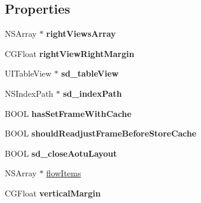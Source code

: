 \subsection*{Properties}
\begin{DoxyCompactItemize}
\item 
\mbox{\label{interface_s_d_u_i_view_category_manager_ae354640ae7cc9607e98d23fac2a69b25}} 
N\+S\+Array $\ast$ {\bfseries right\+Views\+Array}
\item 
\mbox{\label{interface_s_d_u_i_view_category_manager_afdbb633c6c8175f329a9cf359a4ccf23}} 
C\+G\+Float {\bfseries right\+View\+Right\+Margin}
\item 
\mbox{\label{interface_s_d_u_i_view_category_manager_a291791275c352d4af53d2c0990a12442}} 
U\+I\+Table\+View $\ast$ {\bfseries sd\+\_\+table\+View}
\item 
\mbox{\label{interface_s_d_u_i_view_category_manager_add79cbd190a142c84fd532e02b43ddff}} 
N\+S\+Index\+Path $\ast$ {\bfseries sd\+\_\+index\+Path}
\item 
\mbox{\label{interface_s_d_u_i_view_category_manager_a3aacac5f9224752d463cd4673f13c1da}} 
B\+O\+OL {\bfseries has\+Set\+Frame\+With\+Cache}
\item 
\mbox{\label{interface_s_d_u_i_view_category_manager_ae6f330bb7e2d670839139206a104b987}} 
B\+O\+OL {\bfseries should\+Readjust\+Frame\+Before\+Store\+Cache}
\item 
\mbox{\label{interface_s_d_u_i_view_category_manager_ae7d4bfc35f51e343e03007e078f06041}} 
B\+O\+OL {\bfseries sd\+\_\+close\+Aotu\+Layout}
\item 
N\+S\+Array $\ast$ \mbox{\hyperlink{interface_s_d_u_i_view_category_manager_aba90b027e3258361579b73e095bc8a8c}{flow\+Items}}
\item 
\mbox{\label{interface_s_d_u_i_view_category_manager_add4316b2ab8a6299c8a131c504b5e76a}} 
C\+G\+Float {\bfseries vertical\+Margin}

\end{DoxyCompactItemize}
